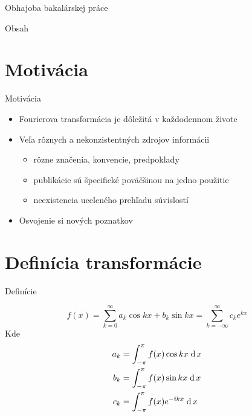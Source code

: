 \documentclass{beamer}
\date{\today}
\title\mytitle
\author\myauthor
\def\dd{\;{\rm d}\,}
\def\imag{\hat{\imath}}
\begin{document}
\begin{frame}{Obhajoba bakalárskej práce}
    \titlepage
\end{frame}

\begin{frame}{Obsah}
    \tableofcontents
\end{frame}

\section{Motivácia}
\begin{frame}{Motivácia}
    \begin{itemize}
        \item Fourierova transformácia je dôležitá v každodennom
              živote
        \item Veľa rôznych a nekonzistentných zdrojov informácii
            \begin{itemize}
                \item rôzne značenia, konvencie, predpoklady
                \item publikácie sú špecifické poväčšinou na jedno použitie
                \item neexistencia uceleného prehľadu súvislostí
            \end{itemize}
        \item Osvojenie si nových poznatkov
    \end{itemize}
\end{frame}

\section{Definícia transformácie}
\begin{frame}{Definície}

    \begin{definition}
        \begin{equation*}
            f(x) = \sum_{k=0}^\infty
                    a_k \cos kx + b_k \sin kx =
                    \sum_{k=-\infty}^\infty
                        c_k e^{kx}
        \end{equation*}
        Kde
        \begin{align*}
            a_k &= \int_{-\pi}^{\pi} f(x) \cos kx \dd x \\
            b_k &= \int_{-\pi}^{\pi} f(x) \sin kx \dd x \\
            c_k &= \int_{-\pi}^{\pi} f(x) e^{-\imag kx} \dd x
        \end{align*}
    \end{definition}
\end{frame}
\end{document}

